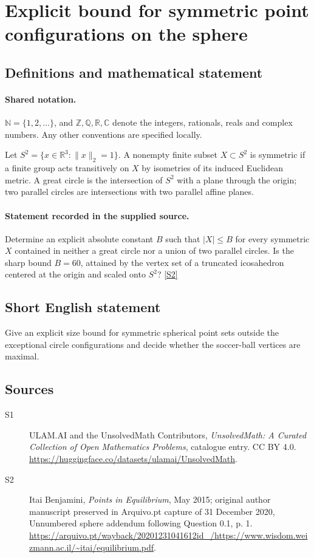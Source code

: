 \documentclass[11pt]{article}
\newcommand{\sref}[2]{\hyperlink{source:#1:#2}{[S#2]}}
\begin{document}
\section{Explicit bound for symmetric point configurations on the sphere}\label{statement}

\subsection{Definitions and mathematical statement}

\paragraph{Shared notation.}$\mathbb N=\{1,2,\ldots\}$, and $\mathbb Z,\mathbb Q,\mathbb R,\mathbb C$ denote the integers, rationals, reals and complex numbers. Any other conventions are specified locally.


Let $S^2=\{x\in\mathbb R^3:\|x\|_2=1\}$. A nonempty finite subset $X\subset S^2$ is symmetric if a finite group acts transitively on $X$ by isometries of its induced Euclidean metric. A great circle is the intersection of $S^2$ with a plane through the origin; two parallel circles are intersections with two parallel affine planes.
\paragraph{Statement recorded in the supplied source.}
Determine an explicit absolute constant $B$ such that $|X|\le B$ for every symmetric $X$ contained in neither a great circle nor a union of two parallel circles. Is the sharp bound $B=60$, attained by the vertex set of a truncated icosahedron centered at the origin and scaled onto $S^2$? \sref{statement}{2}
\subsection{Short English statement}
Give an explicit size bound for symmetric spherical point sets outside the exceptional circle configurations and decide whether the soccer-ball vertices are maximal.
\subsection{Sources}
\begin{description}
\item[\hypertarget{source:statement:1}{S1}] ULAM.AI and the UnsolvedMath Contributors, \emph{UnsolvedMath: A Curated Collection of Open Mathematics Problems}, catalogue entry. CC BY 4.0. \url{https://huggingface.co/datasets/ulamai/UnsolvedMath}.
\item[\hypertarget{source:statement:2}{S2}] Itai Benjamini, \emph{Points in Equilibrium}, May 2015; original author manuscript preserved in Arquivo.pt capture of 31 December 2020, Unnumbered sphere addendum following Question 0.1, p. 1. \url{https://arquivo.pt/wayback/20201231041612id_/https://www.wisdom.weizmann.ac.il/~itai/equilibrium.pdf}.
\end{description}
\label{end:statement}
\end{document}
